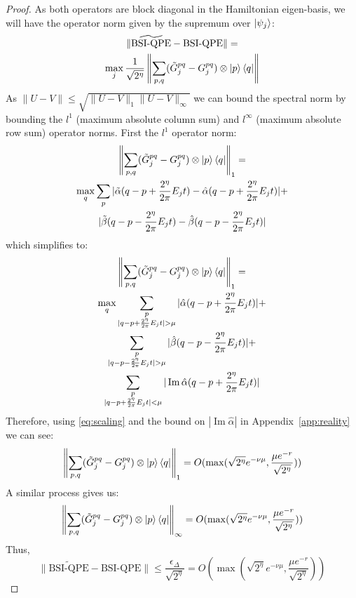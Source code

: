 \documentclass[aps,floatfix,10pt,amssymb,amsfont,amsmath,superscriptaddress,float,nofootinbib,longbibliography,nobalancelastpage,twocolumn]{revtex4-2}
\begin{document}
\begin{proof}
    As both operators are block diagonal in the Hamiltonian eigen-basis, we will have the operator norm given by the supremum over $\ket{\psi_j}$:
    \begin{multline}
        \|\widetilde{\text{BSI-QPE}}-\text{BSI-QPE}\| =\\ \max_j\frac{1}{\sqrt{2^{\eta}}} 
        \left\|\sum_{p,q}(\tilde G^{pq}_j - G^{pq}_j) \otimes \ket{p}\bra{q}\right\|
    \end{multline}
    As $\|U-V\| \leq \sqrt{\|U-V\|_{1}\|U-V\|_{\infty}}$ we can bound the spectral norm by bounding the $l^1$ (maximum absolute column sum) and $l^{\infty}$ (maximum absolute row sum) operator norms. First the $l^1$ operator norm:
    \begin{multline}
         \left\|\sum_{p,q}(\tilde G^{pq}_j - G^{pq}_j) \otimes \ket{p}\bra{q}\right\|_1 =\\ \max_q\sum_{p}|\tilde\alpha(q-p+\frac{2^{\eta}}{2\pi}E_jt)-\hat\alpha(q-p+\frac{2^{\eta}}{2\pi}E_jt)|+\\|\tilde\beta (q-p-\frac{2^{\eta}}{2\pi}E_jt)-\hat\beta (q-p-\frac{2^{\eta}}{2\pi}E_jt)|
    \end{multline}
    which simplifies to:
    \begin{multline}
         \left\|\sum_{p,q}(\tilde G^{pq}_j - G^{pq}_j) \otimes \ket{p}\bra{q}\right\|_1 =\\ \max_q\sum_{\substack{p\\|q-p+\frac{2^{\eta}}{2\pi}E_jt|>\mu}}|\hat\alpha(q-p+\frac{2^{\eta}}{2\pi}E_jt)|+\\\sum_{\substack{p\\|q-p-\frac{2^{\eta}}{2\pi}E_jt|>\mu}}|\hat\beta (q-p-\frac{2^{\eta}}{2\pi}E_jt)| + \\
         \sum_{\substack{p\\|q-p+\frac{2^{\eta}}{2\pi}E_jt|<\mu}}|\operatorname{Im}\hat\alpha(q-p+\frac{2^{\eta}}{2\pi}E_jt)|
    \end{multline}
    Therefore, using \eqref{eq:scaling} and the bound on $|\operatorname{Im}\hat \alpha|$ in Appendix~\ref{app:reality} we can see:
    \begin{equation}
        \left\|\sum_{p,q}(\tilde G^{pq}_j - G^{pq}_j) \otimes \ket{p}\bra{q}\right\|_1 = O(\max(\sqrt{2^{\eta}}e^{-\nu \mu},\frac{\mu e^{-r}}{\sqrt{2^{\eta}}}))
    \end{equation}
    A similar process gives us:
    \begin{equation}
        \left\|\sum_{p,q}(\tilde G^{pq}_j - G^{pq}_j) \otimes \ket{p}\bra{q}\right\|_{\infty} =O(\max(\sqrt{2^{\eta}}e^{-\nu \mu},\frac{\mu e^{-r}}{\sqrt{2^{\eta}}}))
    \end{equation}
    Thus,
    \begin{equation}
        \|\widetilde{\text{BSI-QPE}}-\text{BSI-QPE}\| \leq \frac{\epsilon_{\Delta}}{\sqrt{2^{\eta}}} = O(\max(\sqrt{2^{\eta}}e^{-\nu \mu},\frac{\mu e^{-r}}{\sqrt{2^{\eta}}}))
    \end{equation}
\end{proof}
\end{document}
